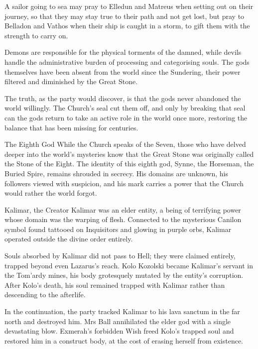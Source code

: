 A sailor going to sea may pray to Elledun and Matreus when setting out on their journey, so that they may stay true to their path and not get lost, but pray to Belladon and Vathos when their ship is caught in a storm, to gift them with the strength to carry on.

Demons are responsible for the physical torments of the damned, while devils handle the administrative burden of processing and categorising souls.  The gods themselves have been absent from the world since the Sundering, their power filtered and diminished by the Great Stone.

The truth, as the party would discover, is that the gods never abandoned the world willingly.  The Church's seal cut them off, and only by breaking that seal can the gods return to take an active role in the world once more, restoring the balance that has been missing for centuries.


\begin{DndSidebar}{The Eighth God}
While the Church speaks of the Seven, those who have delved deeper into the world's mysteries know that the Great Stone was originally called the Stone of the Eight.  The identity of this eighth god, Synne, the Horseman, the Buried Spire, remains shrouded in secrecy.  His domains are unknown, his followers viewed with suspicion, and his mark carries a power that the Church would rather the world forgot.
\end{DndSidebar}

\begin{DndSidebar}{Kalimar, the Creator}
Kalimar was an elder entity, a being of terrifying power whose domain was the warping of flesh.  Connected to the mysterious Canilon symbol found tattooed on Inquisitors and glowing in purple orbs, Kalimar operated outside the divine order entirely.

Souls absorbed by Kalimar did not pass to Hell; they were claimed entirely, trapped beyond even Lazarus's reach.  Kolo Kozolski became Kalimar's servant in the Tom'ardy mines, his body grotesquely mutated by the entity's corruption.  After Kolo's death, his soul remained trapped with Kalimar rather than descending to the afterlife.

In the continuation, the party tracked Kalimar to his lava sanctum in the far north and destroyed him.  Mrs Ball annihilated the elder god with a single devastating blow.  Exmerah's forbidden Wish freed Kolo's trapped soul and restored him in a construct body, at the cost of erasing herself from existence.
\end{DndSidebar}

